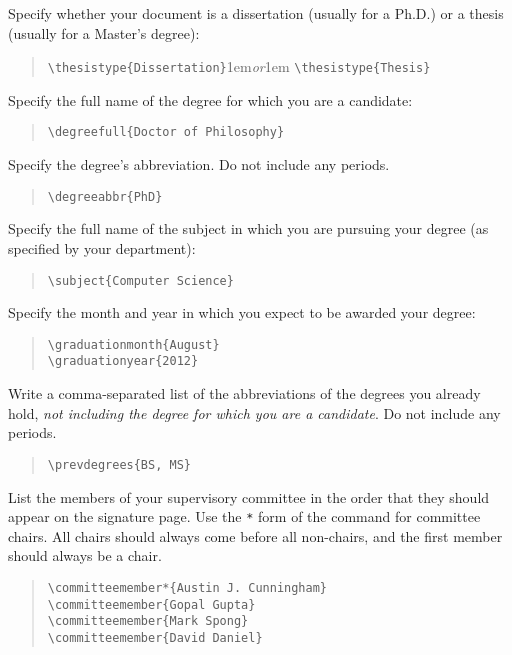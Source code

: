 \documentclass[doublespacing]{utdthesis}
\newenvironment{exampleclasscode}
 {\parindent=1cm\begin{verse}}
 {\end{verse}}
\begin{document}
Specify whether your document is a dissertation (usually for a Ph.D.) or a
thesis (usually for a Master's degree):
\begin{exampleclasscode}
\verb|\thesistype{Dissertation}|\kern1em\textit{or}\kern1em
\verb|\thesistype{Thesis}|
\end{exampleclasscode}

Specify the full name of the degree for which you are a candidate:
\begin{exampleclasscode}
\verb|\degreefull{Doctor of Philosophy}|
\end{exampleclasscode}

Specify the degree's abbreviation.
Do not include any periods.
\begin{exampleclasscode}
\verb|\degreeabbr{PhD}|
\end{exampleclasscode}

Specify the full name of the subject in which you are pursuing your degree
(as specified by your department):
\begin{exampleclasscode}
\verb|\subject{Computer Science}|
\end{exampleclasscode}

Specify the month and year in which you expect to be awarded your degree:
\begin{exampleclasscode}
\verb|\graduationmonth{August}| \\
\verb|\graduationyear{2012}|
\end{exampleclasscode}

Write a comma-separated list of the abbreviations of the degrees you already
hold, \emph{not including the degree for which you are a candidate}.
Do not include any periods.
\begin{exampleclasscode}
\verb|\prevdegrees{BS, MS}|
\end{exampleclasscode}

List the members of your supervisory committee in the order that they should
appear on the signature page.
Use the \texttt{*} form of the command for committee chairs.
All chairs should always come before all non-chairs, and the first member
should always be a chair.
\begin{exampleclasscode}
\verb|\committeemember*{Austin J. Cunningham}| \\
\verb|\committeemember{Gopal Gupta}| \\
\verb|\committeemember{Mark Spong}| \\
\verb|\committeemember{David Daniel}|
\end{exampleclasscode}
\end{document}
